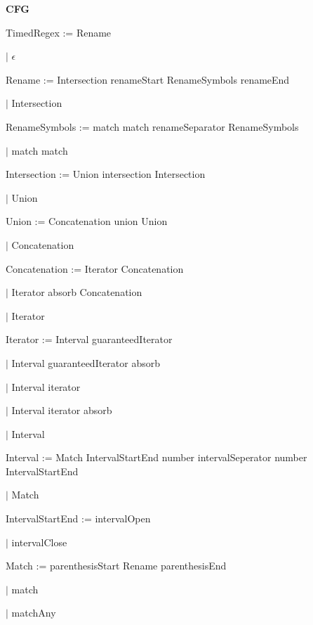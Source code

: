 
\textbf{CFG}

TimedRegex := Rename

\qquad	$\mid$ $\epsilon$

Rename := Intersection renameStart RenameSymbols renameEnd

\qquad $\mid$ Intersection

RenameSymbols := match match renameSeparator RenameSymbols

\qquad $\mid$ match match

Intersection := Union intersection Intersection

\qquad $\mid$ Union

Union := Concatenation union Union

\qquad $\mid$ Concatenation

Concatenation := Iterator Concatenation

\qquad $\mid$ Iterator absorb Concatenation

\qquad $\mid$ Iterator

Iterator := Interval guaranteedIterator

\qquad $\mid$ Interval guaranteedIterator absorb

\qquad $\mid$ Interval iterator

\qquad $\mid$ Interval iterator absorb

\qquad $\mid$ Interval

Interval := Match IntervalStartEnd number intervalSeperator number IntervalStartEnd

\qquad $\mid$ Match

IntervalStartEnd := intervalOpen

\qquad $\mid$ intervalClose

Match := parenthesisStart Rename parenthesisEnd

\qquad $\mid$ match

\qquad $\mid$ matchAny

